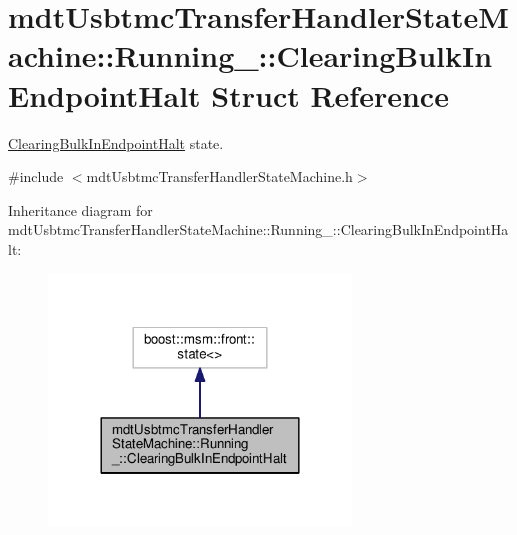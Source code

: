 \hypertarget{structmdt_usbtmc_transfer_handler_state_machine_1_1_running___1_1_clearing_bulk_in_endpoint_halt}{\section{mdt\-Usbtmc\-Transfer\-Handler\-State\-Machine\-:\-:Running\-\_\-\-:\-:Clearing\-Bulk\-In\-Endpoint\-Halt Struct Reference}
\label{structmdt_usbtmc_transfer_handler_state_machine_1_1_running___1_1_clearing_bulk_in_endpoint_halt}
}


\hyperlink{structmdt_usbtmc_transfer_handler_state_machine_1_1_running___1_1_clearing_bulk_in_endpoint_halt}{Clearing\-Bulk\-In\-Endpoint\-Halt} state.  




{\ttfamily \#include $<$mdt\-Usbtmc\-Transfer\-Handler\-State\-Machine.\-h$>$}



Inheritance diagram for mdt\-Usbtmc\-Transfer\-Handler\-State\-Machine\-:\-:Running\-\_\-\-:\-:Clearing\-Bulk\-In\-Endpoint\-Halt\-:
\nopagebreak
\begin{figure}[H]
\begin{center}
\leavevmode
\includegraphics[width=228pt]{structmdt_usbtmc_transfer_handler_state_machine_1_1_running___1_1_clearing_bulk_in_endpoint_halt__inherit__graph}
\end{center}
\end{figure}


